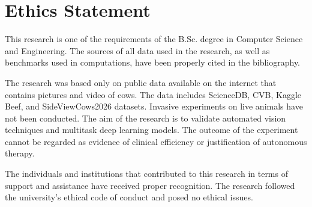 \section*{Ethics Statement}

This research is one of the requirements of the B.Sc. degree in Computer Science and Engineering. The sources of all data used in the research, as well as benchmarks used in computations, have been properly cited in the bibliography.

The research was based only on public data available on the internet that contains pictures and video of cows. The data includes ScienceDB, CVB, Kaggle Beef, and SideViewCows2026 datasets. Invasive experiments on live animals have not been conducted. The aim of the research is to validate automated vision techniques and multitask deep learning models. The outcome of the experiment cannot be regarded as evidence of clinical efficiency or justification of autonomous therapy.

The individuals and institutions that contributed to this research in terms of support and assistance have received proper recognition. The research followed the university's ethical code of conduct and posed no ethical issues.

\clearpage
